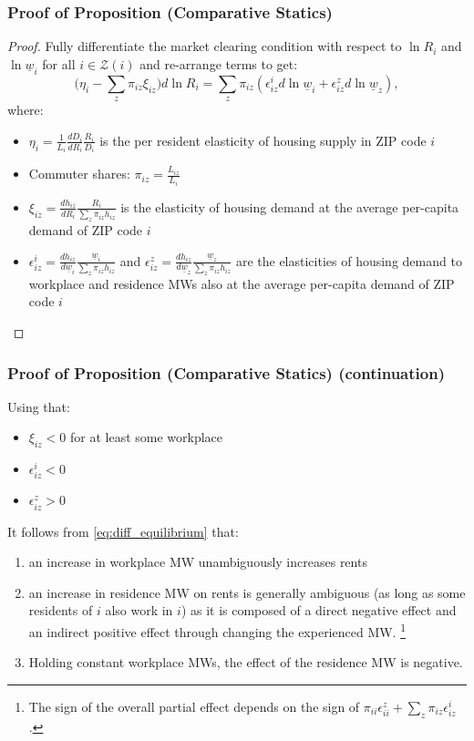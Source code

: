\documentclass[aspectratio=169, t]{beamer}
\newcommand{\Z}{\mathcal{Z}}
\newcommand{\MW}{\underline{w}}
\begin{document}
\begin{frame}[label = proof_comp_stat]
\frametitle{Proof of Proposition (Comparative Statics)}

\begin{proof}
    Fully differentiate the market clearing condition with respect to $\ln R_i$ and 
    $\ln \MW_i$ for all $i\in\Z(i)$ and re-arrange terms to get:
    \begin{equation}\label{eq:diff_equilibrium}
        \Big(\eta_i - \sum_z \pi_{iz} \xi_{iz} \Big) d \ln R_i
        = 
        \sum_z \pi_{iz} \left(\epsilon_{iz}^i d \ln \MW_i 
                            + \epsilon_{iz}^z d \ln \MW_z \right) ,
    \end{equation}
    where:
    \begin{itemize}
        \item $\eta_i = \frac{1}{L_i} \frac{d D_i}{d R_i} \frac{R_i}{D_i}$ is the per resident elasticity 
        of housing supply in ZIP code $i$
        \item Commuter shares: $\pi_{iz} = \frac{L_{iz}}{L_i}$
        \item $\xi_{iz} = \frac{d h_{iz}}{d R_i} \frac{R_i}{\sum_z \pi_{iz} h_{iz}}$ is the 
        elasticity of housing demand at the average per-capita demand of ZIP code $i$
        \item  $\epsilon_{iz}^i = \frac{d h_{iz}}{d \MW_i} \frac{\MW_i}{\sum_z \pi_{iz} h_{iz}}$ and 
        $\epsilon_{iz}^z = \frac{d h_{iz}}{d \MW_z} \frac{\MW_z}{\sum_z \pi_{iz} h_{iz}}$ 
        are the elasticities of housing demand to workplace and residence MWs also at
         the average per-capita demand of ZIP code $i$
    \end{itemize}
\end{proof}
\end{frame}

\begin{frame}
    \frametitle{Proof of Proposition (Comparative Statics) (continuation)}
    
    Using that:
    \begin{itemize} 
        \item $\xi_{iz} < 0$ for at least some workplace
        \item $\epsilon_{iz}^i < 0$
        \item $\epsilon_{iz}^z > 0$
    \end{itemize}
    It follows from \eqref{eq:diff_equilibrium} that:
    \begin{enumerate}
        \item an increase in workplace MW unambiguously increases rents
        \item an increase in residence MW on rents is generally ambiguous 
        (as long as some residents of $i$ also work in $i$) as it is composed of a direct negative 
        effect and an indirect positive effect through changing the experienced MW. \footnote{The sign of the overall partial effect depends on the sign of 
    $\pi_{ii} \epsilon_{ii}^z + \sum_z \pi_{iz} \epsilon_{iz}^i$.}
        \item Holding constant workplace MWs, the effect of the residence MW is negative.
    \end{enumerate}    
\end{frame}
\end{document}

